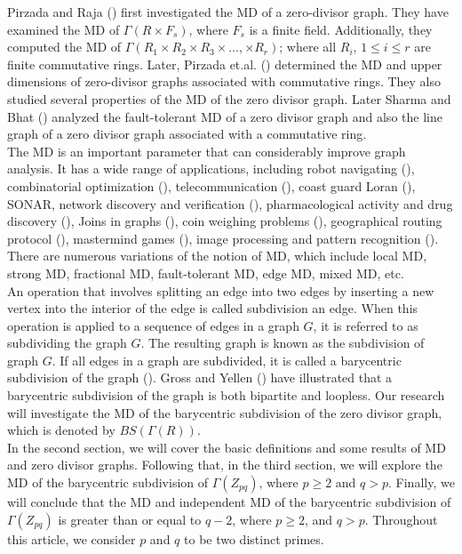 \documentclass[]{interact}
\theoremstyle{plain}%
\theoremstyle{definition}
\theoremstyle{remark}
\begin{document}
\noindent Pirzada and Raja (\cite{pir}) first investigated the MD of a zero-divisor graph. They have examined the MD of $\Gamma(R \times F_s)$, where $F_s$ is a finite field. Additionally, they computed the MD of $\Gamma(R_1\times R_2\times R_3\times \ldots,\times R_r)$;
 where all $R_i$, $1\leq i\leq r$
  are finite commutative rings. Later, Pirzada et.al. (\cite{pi}) determined the MD and upper dimensions of zero-divisor graphs associated with commutative rings. They also studied several properties of the MD of the zero divisor graph. Later Sharma and Bhat (\cite{ss}) analyzed the fault-tolerant MD of a zero divisor graph and also the line graph of a zero divisor graph associated with a commutative ring. \\
 
 \noindent The MD is an important parameter that can considerably improve graph analysis. It has a wide range of applications, including robot navigating (\cite{kh}), combinatorial optimization (\cite{se}), telecommunication (\cite{be}), coast guard Loran (\cite{sl}), SONAR, network discovery and verification (\cite{be}), pharmacological activity and drug discovery (\cite{chr}), Joins in graphs (\cite{se}), coin weighing problems (\cite{so}), geographical routing protocol (\cite{li}), mastermind games (\cite{chv}), image processing and pattern recognition (\cite{be,ra}).
 There are numerous variations of the notion of MD, which include local MD, strong MD, fractional MD, fault-tolerant MD, edge MD, mixed MD, etc. \\
 
 \noindent  An operation that involves splitting an edge into two edges by inserting a new vertex into the interior of the edge is called subdivision an edge. When this operation is applied to a sequence of edges in a graph $G$, it is referred to as subdividing the graph \( G \). The resulting graph is known as the subdivision of graph \( G \). If all edges in a graph are subdivided, it is called a barycentric subdivision of the graph (\cite{koam}). Gross and Yellen (\cite{jl}) have illustrated that a barycentric subdivision of the graph is both bipartite and loopless. Our research will investigate the MD of the barycentric subdivision of the zero divisor graph, which is denoted by $BS(\Gamma(R))$.\\

  \noindent  In the second section, we will cover the basic definitions and some results of MD and zero divisor graphs. Following that, in the third section, we will explore the MD of the barycentric subdivision of $\Gamma(Z_{pq})$, where $p\geq2$ and $q>p$. Finally, we will conclude that the MD and independent MD of the barycentric subdivision of $\Gamma(Z_{pq})$ is greater than or equal to $q-2$, where $p\geq 2$, and $q>p$. Throughout this article, we consider $p$ and $q$ to be two distinct primes.
\end{document}
